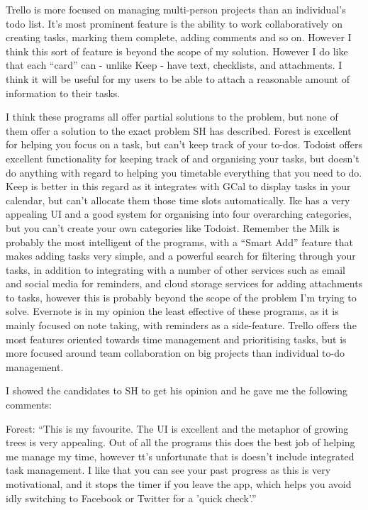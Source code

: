 \documentclass[]{article}
\begin{document}
Trello is more focused on managing multi-person projects than an
individual's todo list. It's most prominent feature is the ability to
work collaboratively on creating tasks, marking them complete, adding
comments and so on. However I think this sort of feature is beyond the
scope of my solution. However I do like that each ``card'' can - unlike
Keep - have text, checklists, and attachments. I think it will be useful
for my users to be able to attach a reasonable amount of information to
their tasks.

I think these programs all offer partial solutions to the problem, but
none of them offer a solution to the exact problem SH has described.
Forest is excellent for helping you focus on a task, but can't keep
track of your to-dos. Todoist offers excellent functionality for keeping
track of and organising your tasks, but doesn't do anything with regard
to helping you timetable everything that you need to do. Keep is better
in this regard as it integrates with GCal to display tasks in your
calendar, but can't allocate them those time slots automatically. Ike
has a very appealing UI and a good system for organising into four
overarching categories, but you can't create your own categories like
Todoist. Remember the Milk is probably the most intelligent of the
programs, with a ``Smart Add'' feature that makes adding tasks very
simple, and a powerful search for filtering through your tasks, in
addition to integrating with a number of other services such as email
and social media for reminders, and cloud storage services for adding
attachments to tasks, however this is probably beyond the scope of the
problem I'm trying to solve. Evernote is in my opinion the least
effective of these programs, as it is mainly focused on note taking,
with reminders as a side-feature. Trello offers the most features
oriented towards time management and prioritising tasks, but is more
focused around team collaboration on big projects than individual to-do
management.

I showed the candidates to SH to get his opinion and he gave me the
following comments:

Forest: ``This is my favourite. The UI is excellent and the metaphor of
growing trees is very appealing. Out of all the programs this does the
best job of helping me manage my time, however tt's unfortunate that is
doesn't include integrated task management. I like that you can see your
past progress as this is very motivational, and it stops the timer if
you leave the app, which helps you avoid idly switching to Facebook or
Twitter for a 'quick check'.''
\end{document}
